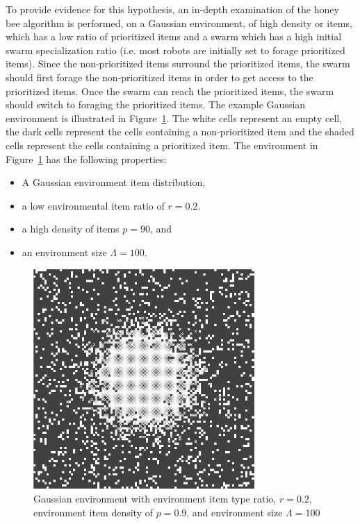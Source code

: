 To provide evidence for this hypothesis, an in-depth examination of the honey bee algorithm is performed, on a Gaussian environment, of high density or items, which has a low ratio of prioritized items and a swarm which has a high initial swarm specialization ratio (i.e. most robots are initially set to forage prioritized items). Since the non-prioritized items surround the prioritized items, the swarm should first forage the non-prioritized items in order to get access to the prioritized items. Once the swarm can reach the prioritized items, the swarm should switch to foraging the prioritized items. The example Gaussian environment is illustrated in Figure~\ref{fig:gaussianhighdensityenv}. The white cells represent an empty cell, the dark cells represent the cells containing a non-prioritized item and the shaded cells represent the cells containing a prioritized item. The environment in Figure~\ref{fig:gaussianhighdensityenv} has the following properties:

\begin{itemize}
\item A Gaussian environment item distribution,
\item a low environmental item ratio of $r=0.2$.
\item a high density of items $p=90$, and
\item an environment size $\Lambda=100$.
\end{itemize}

\begin{figure}[!htb]
\centering
\includegraphics[width=0.75\textwidth]{chapters/chapter6/figures/flexibility-gaussian-obj90-ratio.PNG}
\caption{Gaussian environment with environment item type ratio, $r=0.2$, environment item density of $p=0.9$, and environment size $\Lambda=100$}
\label{fig:gaussianhighdensityenv}
\end{figure}

